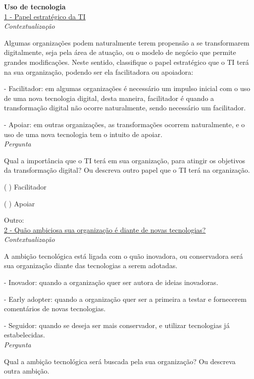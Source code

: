 \textbf{Uso de tecnologia}\\

\underline{1 - Papel estratégico da TI}\\

\textit{Contextualização}

Algumas organizações podem naturalmente terem propensão a se transformarem digitalmente, seja pela área de atuação, ou o modelo de negócio que permite grandes modificações. Neste sentido, classifique o papel estratégico que o TI terá na sua organização, podendo ser ela facilitadora ou apoiadora:

- Facilitador: em algumas organizações é necessário um impulso inicial com o uso de uma nova tecnologia digital, desta maneira, facilitador é quando a transformação digital não ocorre naturalmente, sendo necessário um facilitador.

- Apoiar: em outras organizações, as transformações ocorrem naturalmente, e o uso de uma nova tecnologia tem o intuito de apoiar.\\

\textit{Pergunta}

Qual a importância que o TI terá em sua organização, para atingir os objetivos da transformação digital? Ou descreva outro papel que o TI terá na organização.

( ) Facilitador

( ) Apoiar

Outro:\\


\underline{2 - Quão ambiciosa sua organização é diante de novas tecnologias?}\\

\textit{Contextualização}

A ambição tecnológica está ligada com o quão inovadora, ou conservadora será sua organização diante das tecnologias a serem adotadas.

- Inovador: quando a organização quer ser autora de ideias inovadoras.

- Early adopter: quando a organização quer ser a primeira a testar e fornecerem comentários de novas tecnologias.

- Seguidor: quando se deseja ser mais conservador, e utilizar tecnologias já estabelecidas.\\

\textit{Pergunta}

Qual a ambição tecnológica será buscada pela sua organização? Ou descreva outra ambição.

